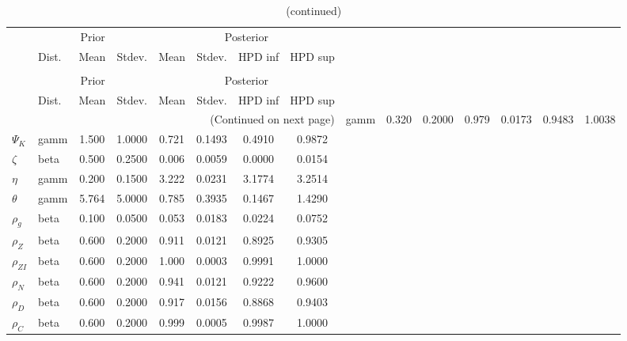  
\begin{center}
\begin{longtable}{llcccccc} 
\caption{Results from Metropolis-Hastings (parameters)}
 \label{Table:MHPosterior:1}\\
\toprule 
  & \multicolumn{3}{c}{Prior}  &  \multicolumn{4}{c}{Posterior} \\
  \cmidrule(r{.75em}){2-4} \cmidrule(r{.75em}){5-8}
  & Dist. & Mean  & Stdev. & Mean & Stdev. & HPD inf & HPD sup\\
\midrule \endfirsthead 
\caption{(continued)}\\\toprule 
  & \multicolumn{3}{c}{Prior}  &  \multicolumn{4}{c}{Posterior} \\
  \cmidrule(r{.75em}){2-4} \cmidrule(r{.75em}){5-8}
  & Dist. & Mean  & Stdev. & Mean & Stdev. & HPD inf & HPD sup\\
\midrule \endhead 
\bottomrule \multicolumn{8}{r}{(Continued on next page)} \endfoot 
\bottomrule \endlastfoot 
${\sigma_a}$ & gamm &   0.320 & 0.2000 &   0.979& 0.0173 &  0.9483 &  1.0038 \\ 
${\Psi_K}$ & gamm &   1.500 & 1.0000 &   0.721& 0.1493 &  0.4910 &  0.9872 \\ 
${\zeta}$ & beta &   0.500 & 0.2500 &   0.006& 0.0059 &  0.0000 &  0.0154 \\ 
${\eta}$ & gamm &   0.200 & 0.1500 &   3.222& 0.0231 &  3.1774 &  3.2514 \\ 
${\theta}$ & gamm &   5.764 & 5.0000 &   0.785& 0.3935 &  0.1467 &  1.4290 \\ 
${\rho_g}$ & beta &   0.100 & 0.0500 &   0.053& 0.0183 &  0.0224 &  0.0752 \\ 
${\rho_Z}$ & beta &   0.600 & 0.2000 &   0.911& 0.0121 &  0.8925 &  0.9305 \\ 
${\rho_{ZI}}$ & beta &   0.600 & 0.2000 &   1.000& 0.0003 &  0.9991 &  1.0000 \\ 
${\rho_N}$ & beta &   0.600 & 0.2000 &   0.941& 0.0121 &  0.9222 &  0.9600 \\ 
${\rho_D}$ & beta &   0.600 & 0.2000 &   0.917& 0.0156 &  0.8868 &  0.9403 \\ 
${\rho_C}$ & beta &   0.600 & 0.2000 &   0.999& 0.0005 &  0.9987 &  1.0000 \\ 
\end{longtable}
 \end{center}
